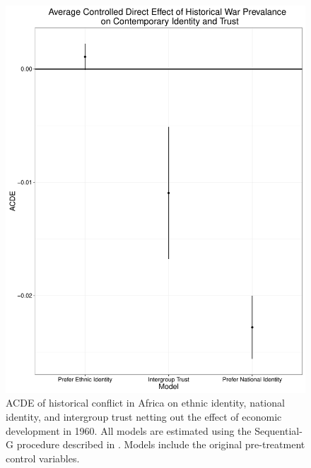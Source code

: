 \begin{figure}
\begin{center}
\includegraphics[scale=0.3]{Figures/acde_trust}
\caption{ACDE of historical conflict in Africa on ethnic identity, national identity, and intergroup trust netting out the effect of economic development in 1960. All models are estimated using the Sequential-G procedure described in \citet{AcharyaBlackwellSen2016}. Models include the original pre-treatment control variables.}
\label{fig:acdetrust}
\end{center}
\end{figure}


